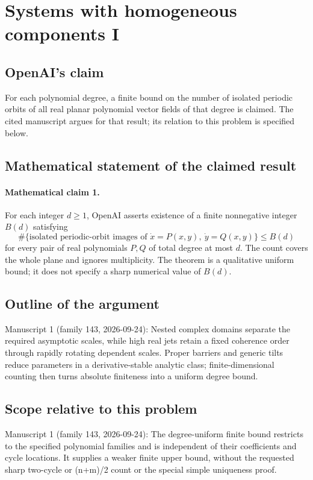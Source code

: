 \documentclass[11pt]{article}
\begin{document}
\section*{Systems with homogeneous components I}

\subsection{OpenAI's claim}
For each polynomial degree, a finite bound on the number of isolated periodic orbits of all real planar polynomial vector fields of that degree is claimed. The cited manuscript argues for that result; its relation to this problem is specified below.

\subsection{Mathematical statement of the claimed result}
\paragraph{Mathematical claim 1.} For each integer $d\ge1$, OpenAI asserts existence of a finite nonnegative integer $B(d)$ satisfying
\[
\#\{\text{isolated periodic-orbit images of }\dot x=P(x,y),\ \dot y=Q(x,y)\}\le B(d)
\]
for every pair of real polynomials $P,Q$ of total degree at most $d$. The count covers the whole plane and ignores multiplicity. The theorem is a qualitative uniform bound; it does not specify a sharp numerical value of $B(d)$.

\subsection{Outline of the argument}
Manuscript 1 (family 143, 2026-09-24): Nested complex domains separate the required asymptotic scales, while high real jets retain a fixed coherence order through rapidly rotating dependent scales. Proper barriers and generic tilts reduce parameters in a derivative-stable analytic class; finite-dimensional counting then turns absolute finiteness into a uniform degree bound.

\subsection{Scope relative to this problem}
Manuscript 1 (family 143, 2026-09-24): The degree-uniform finite bound restricts to the specified polynomial families and is independent of their coefficients and cycle locations. It supplies a weaker finite upper bound, without the requested sharp two-cycle or (n+m)/2 count or the special simple uniqueness proof.
\end{document}
